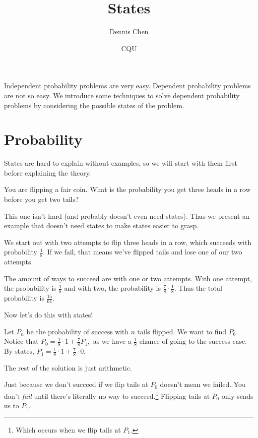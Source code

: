 \documentclass{article}
\title{States}
\author{Dennis Chen}
\date{CQU}
\begin{document}
\maketitle

Independent probability problems are very easy. Dependent probability problems are not so easy. We introduce some techniques to solve dependent probability problems by considering the possible states of the problem.

\section{Probability}
States are hard to explain without examples, so we will start with them first before explaining the theory.

\begin{exam}
You are flipping a fair coin. What is the probability you get three heads in a row before you get two tails?
\end{exam}

This one isn't hard (and probably doesn't even need states). Thus we present an example that doesn't need states to make states easier to grasp.

\begin{sol}[1]
We start out with two attempts to flip three heads in a row, which succeeds with probability $\frac{1}{8}.$ If we fail, that means we've flipped tails and lose one of our two attempts.

The amount of ways to succeed are with one or two attempts. With one attempt, the probability is $\frac{1}{8}$ and with two, the probability is $\frac{7}{8}\cdot\frac{1}{8}.$ Thus the total probability is $\frac{15}{64}.$
\end{sol}

Now let's do this with states!

\begin{sol}[2]
Let $P_n$  be the probability of success with $n$ tails flipped. We want to find $P_0.$ Notice that $P_0=\frac{1}{8}\cdot 1+\frac{7}{8}P_1,$ as we have a $\frac{1}{8}$ chance of going to the success case. By states, $P_1=\frac{1}{8}\cdot 1+\frac{7}{8}\cdot 0.$

The rest of the solution is just arithmetic.
\end{sol}
Just because we don't succeed if we flip tails at $P_0$ doesn't mean we failed. You don't \textit{fail} until there's literally no way to succeed.\footnote{Which occurs when we flip tails at $P_1.$} Flipping tails at $P_0$ only sends us to $P_1.$
\end{document}
